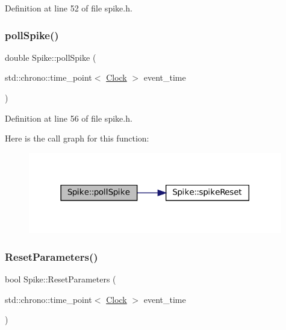 Definition at line 52 of file spike.\+h.

\mbox{\label{class_spike_ac465dbe6500f1eb1f5421f7174f91dd3}} 
\subsubsection{\texorpdfstring{poll\+Spike()}{pollSpike()}}
{\footnotesize\ttfamily double Spike\+::poll\+Spike (\begin{DoxyParamCaption}\item[{std\+::chrono\+::time\+\_\+point$<$ \mbox{\hyperlink{universe_8h_a0ef8d951d1ca5ab3cfaf7ab4c7a6fd80}{Clock}} $>$}]{event\+\_\+time }\end{DoxyParamCaption})\hspace{0.3cm}{\ttfamily [inline]}}



Definition at line 56 of file spike.\+h.

Here is the call graph for this function\+:\nopagebreak
\begin{figure}[H]
\begin{center}
\leavevmode
\includegraphics[width=314pt]{class_spike_ac465dbe6500f1eb1f5421f7174f91dd3_cgraph}
\end{center}
\end{figure}
\mbox{\label{class_spike_af4475560da7a33e70a0f2036197f000f}} 
\subsubsection{\texorpdfstring{Reset\+Parameters()}{ResetParameters()}}
{\footnotesize\ttfamily bool Spike\+::\+Reset\+Parameters (\begin{DoxyParamCaption}\item[{std\+::chrono\+::time\+\_\+point$<$ \mbox{\hyperlink{universe_8h_a0ef8d951d1ca5ab3cfaf7ab4c7a6fd80}{Clock}} $>$}]{event\+\_\+time }\end{DoxyParamCaption})}



